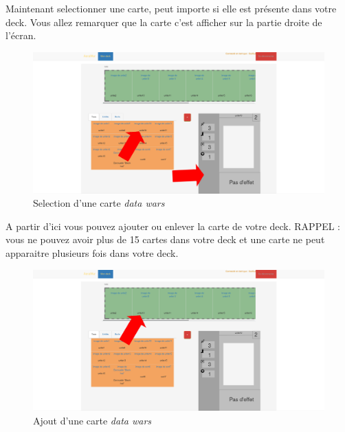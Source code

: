 \documentclass[a4paper,11pt]{report}
\begin{document}
	Maintenant selectionner une carte, peut importe si elle est présente dans votre deck. 	Vous allez remarquer que la carte c'est afficher sur la partie droite de l'écran.

	\begin{figure}[th]
		\begin{center}
		\includegraphics[scale=0.4]{Assets/carte_deck.png}
      		\caption{Selection d'une carte \textit{data wars}}
      		\label{fig2}
     		\end{center}
	\end{figure}

	A partir d'ici vous pouvez ajouter ou enlever la carte de votre deck.
RAPPEL : vous ne pouvez avoir plus de 15 cartes dans votre deck et une carte ne peut apparaitre plusieurs fois dans votre deck.

	\begin{figure}[th]
		\begin{center}
		\includegraphics[scale=0.4]{Assets/add_deck.png}
      		\caption{Ajout d'une carte \textit{data wars}}
      		\label{fig2}
     		\end{center}
	\end{figure}

        
\end{document}
